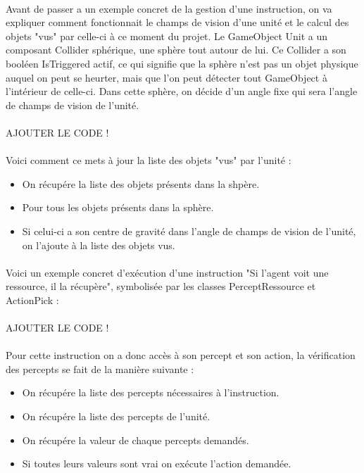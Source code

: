 \documentclass{report}
\begin{document}
\paragraph{}Avant de passer a un exemple concret de la gestion d'une instruction, on va expliquer comment fonctionnait le champs de vision d'une unité et le calcul des objets "vus" par celle-ci à ce moment du projet.
Le GameObject Unit a un composant Collider sphérique, une sphère tout autour de lui. Ce Collider a son booléen IsTriggered actif, ce qui signifie que la sphère n'est pas un objet physique auquel on peut se heurter, mais que l'on peut détecter tout GameObject à l'intérieur de celle-ci. Dans cette sphère, on décide d'un angle fixe qui sera l'angle de champs de vision de l'unité.
\paragraph{}
AJOUTER LE CODE !
\paragraph{}
Voici comment ce mets à jour la liste des objets "vus" par l'unité :
\begin{itemize}
\item On récupére la liste des objets présents dans la shpère.
\item Pour tous les objets présents dans la sphère.
\item Si celui-ci a son centre de gravité dans l'angle de champs de vision de l'unité, on l'ajoute à la liste des objets vus.
\end{itemize}
\paragraph{}Voici un exemple concret d'exécution d'une instruction "Si l'agent voit une ressource, il la récupère", symbolisée par les classes PerceptRessource et ActionPick :
\paragraph{}
AJOUTER LE CODE !
\paragraph{}
Pour cette instruction on a donc accès à son percept et son action, la vérification des percepts se fait de la manière suivante :
\begin{itemize}
\item On récupére la liste des percepts nécessaires à l'instruction.
\item On récupére la liste des percepts de l'unité.
\item On récupére la valeur de chaque percepts demandés.
\item Si toutes leurs valeurs sont vrai on exécute l'action demandée.
\end{itemize}
\end{document}
